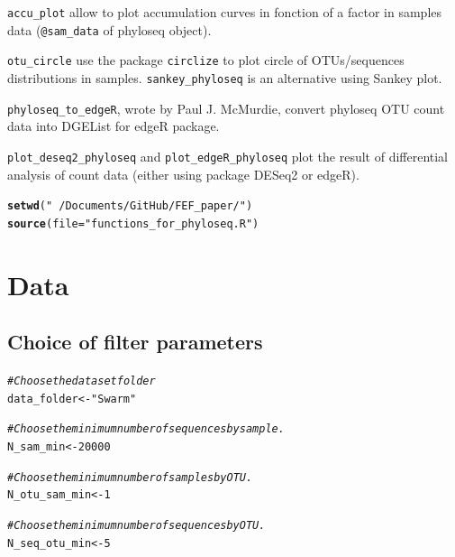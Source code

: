\documentclass[12pt]{article}\usepackage[]{graphicx}\usepackage[]{color}
\makeatletter
\newcommand{\hlnum}[1]{\textcolor[rgb]{0.686,0.059,0.569}{#1}}%
\newcommand{\hlstr}[1]{\textcolor[rgb]{0.192,0.494,0.8}{#1}}%
\newcommand{\hlcom}[1]{\textcolor[rgb]{0.678,0.584,0.686}{\textit{#1}}}%
\newcommand{\hlstd}[1]{\textcolor[rgb]{0.345,0.345,0.345}{#1}}%
\newcommand{\hlkwb}[1]{\textcolor[rgb]{0.69,0.353,0.396}{#1}}%
\newcommand{\hlkwc}[1]{\textcolor[rgb]{0.333,0.667,0.333}{#1}}%
\newcommand{\hlkwd}[1]{\textcolor[rgb]{0.737,0.353,0.396}{\textbf{#1}}}%
\newenvironment{kframe}{%
 \def\at@end@of@kframe{}%
 \ifinner\ifhmode%
  \def\at@end@of@kframe{\end{minipage}}%
  \begin{minipage}{\columnwidth}%
 \fi\fi%
 \def\FrameCommand##1{\hskip\@totalleftmargin \hskip-\fboxsep
 \colorbox{shadecolor}{##1}\hskip-\fboxsep
     \hskip-\linewidth \hskip-\@totalleftmargin \hskip\columnwidth}%
 \MakeFramed {\advance\hsize-\width
   \@totalleftmargin\z@ \linewidth\hsize
   \@setminipage}}%
 {\par\unskip\endMakeFramed%
 \at@end@of@kframe}
\newenvironment{knitrout}{}{} %
\numberwithin{figure}{section}
\makeatother
\begin{document}
\texttt{accu\_plot} allow to plot accumulation curves in fonction of a factor in samples data (\texttt{@sam\_data} of phyloseq object).

\texttt{otu\_circle} use the package \texttt{circlize} to plot circle of OTUs/sequences distributions in samples. \texttt{sankey\_phyloseq} is an alternative using Sankey plot.

\texttt{phyloseq\_to\_edgeR}, wrote by Paul J. McMurdie, convert phyloseq OTU count data into DGEList for edgeR package.

\texttt{plot\_deseq2\_phyloseq} and \texttt{plot\_edgeR\_phyloseq} plot the result of differential analysis of count data (either using package DESeq2 or edgeR).

\begin{knitrout}\small
{}\color{fgcolor}\begin{kframe}
\begin{alltt}
\hlkwd{setwd}\hlstd{(}\hlstr{"~/Documents/GitHub/FEF_paper/"}\hlstd{)}
\hlkwd{source}\hlstd{(}\hlkwc{file} \hlstd{=} \hlstr{"functions_for_phyloseq.R"}\hlstd{)}
\end{alltt}
\end{kframe}
\end{knitrout}


\section{Data}
  
  \subsection{Choice of filter parameters}
  \label{section:filter}
\begin{knitrout}\small
{}\color{fgcolor}\begin{kframe}
\begin{alltt}
\hlcom{#Choose the dataset folder}
\hlstd{data_folder} \hlkwb{<-} \hlstr{"Swarm"}

\hlcom{#Choose the minimum number of sequences by sample.}
\hlstd{N_sam_min} \hlkwb{<-} \hlnum{20000}

\hlcom{#Choose the minimum number of samples by OTU.}
\hlstd{N_otu_sam_min} \hlkwb{<-} \hlnum{1}

\hlcom{#Choose the minimum number of sequences by OTU.}
\hlstd{N_seq_otu_min} \hlkwb{<-} \hlnum{5}
\end{alltt}
\end{kframe}
\end{knitrout}
\end{document}
